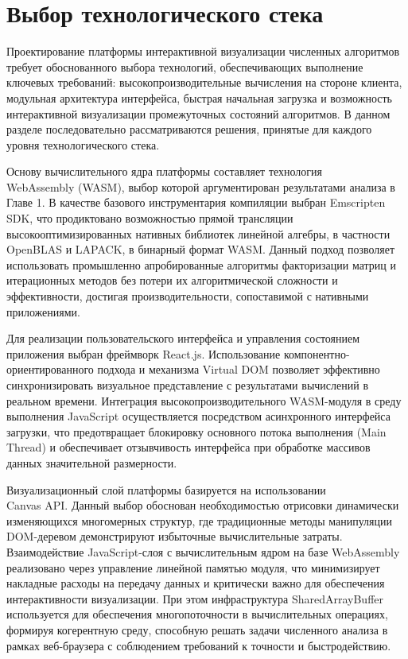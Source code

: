 \documentclass[12pt, oneside]{book}
\begin{document}
\section{Выбор технологического стека}

    \quad Проектирование платформы интерактивной визуализации численных алгоритмов требует обоснованного выбора технологий, обеспечивающих выполнение ключевых требований: высокопроизводительные вычисления на стороне клиента, модульная архитектура интерфейса, быстрая начальная загрузка и возможность интерактивной визуализации промежуточных состояний алгоритмов. В данном разделе последовательно рассматриваются решения, принятые для каждого уровня технологического стека.

    \quad Основу вычислительного ядра платформы составляет технология\\ WebAssembly (WASM), выбор которой аргументирован результатами анализа в Главе 1. В качестве базового инструментария компиляции выбран Emscripten SDK, что продиктовано возможностью прямой трансляции высокооптимизированных нативных библиотек линейной алгебры, в частности OpenBLAS и LAPACK, в бинарный формат WASM. Данный подход позволяет использовать промышленно апробированные алгоритмы факторизации матриц и итерационных методов без потери их алгоритмической сложности и эффективности, достигая производительности, сопоставимой с нативными приложениями.

    \quad Для реализации пользовательского интерфейса и управления состоянием приложения выбран фреймворк React.js. Использование компонентно-ориентированного подхода и механизма Virtual DOM позволяет эффективно синхронизировать визуальное представление с результатами вычислений в реальном времени. Интеграция высокопроизводительного WASM-модуля в среду выполнения JavaScript осуществляется посредством асинхронного интерфейса загрузки, что предотвращает блокировку основного потока выполнения (Main Thread) и обеспечивает отзывчивость интерфейса при обработке массивов данных значительной размерности.

    \quad Визуализационный слой платформы базируется на использовании\\ Canvas API. Данный выбор обоснован необходимостью отрисовки динамически изменяющихся многомерных структур, где традиционные методы манипуляции DOM-деревом демонстрируют избыточные вычислительные затраты. Взаимодействие JavaScript-слоя с вычислительным ядром на базе WebAssembly реализовано через управление линейной памятью модуля, что минимизирует накладные расходы на передачу данных и критически важно для обеспечения интерактивности визуализации. При этом инфраструктура SharedArrayBuffer используется для обеспечения многопоточности в вычислительных операциях, формируя когерентную среду, способную решать задачи численного анализа в рамках веб-браузера с соблюдением требований к точности и быстродействию.
\end{document}
